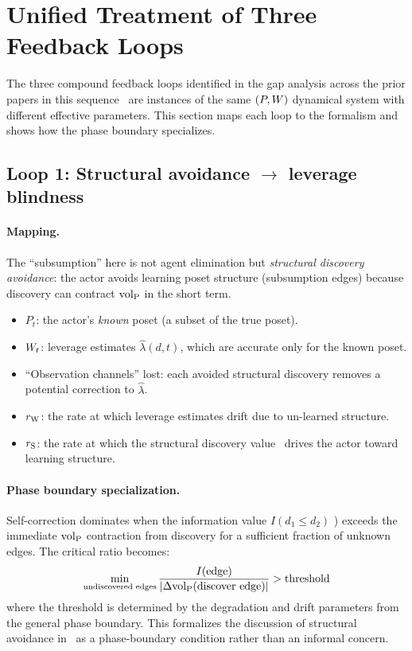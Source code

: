 \section{Unified Treatment of Three Feedback Loops}
\label{sec:unified_loops}

The three compound feedback loops identified in the gap analysis across
the prior papers in this sequence~\citep{lasser2026gfm,lasser2026poset,lasser2026horizon,lasser2026scm,lasser2026exo} are instances of the same $(P, W)$ dynamical system with
different effective parameters.  This section maps each loop to the
formalism and shows how the phase boundary specializes.

\subsection{Loop 1: Structural avoidance $\to$ leverage blindness}

\paragraph{Mapping.}
The ``subsumption'' here is not agent elimination but \emph{structural
discovery avoidance}: the actor avoids learning poset structure
(subsumption edges) because discovery can contract ${\operatorname{vol}_{\mathrm{P}}}$ in the short
term.

\begin{itemize}
\item $P_t$: the actor's \emph{known} poset (a subset of the true
  poset).
\item $W_t$: leverage estimates $\hat{\lambda}(d, t)$, which are
  accurate only for the known poset.
\item ``Observation channels'' lost: each avoided structural discovery
  removes a potential correction to $\hat{\lambda}$.
\item $r_{\mathrm{W}}$: the rate at which leverage estimates drift due to
  un-learned structure.
\item $r_{\mathrm{S}}$: the rate at which the structural discovery
  value~\citep[Proposition~2, Definition~5]{lasser2026horizon} drives the actor toward
  learning structure.
\end{itemize}

\paragraph{Phase boundary specialization.}
Self-correction dominates when the information value $I(d_1 \leq d_2)$
\citep[Definition~5]{lasser2026horizon}) exceeds the immediate ${\operatorname{vol}_{\mathrm{P}}}$ contraction from
discovery for a sufficient fraction of unknown edges.  The critical
ratio becomes:
\begin{equation}
\label{eq:loop1_boundary}
\min_{\text{undiscovered edges}}
  \frac{I(\text{edge})}{|\Delta{\operatorname{vol}_{\mathrm{P}}}(\text{discover edge})|}
  > \text{threshold}
\end{equation}
where the threshold is determined by the degradation and drift
parameters from the general phase boundary.  This formalizes the
discussion of structural avoidance in~\citet{lasser2026poset} as a phase-boundary condition
rather than an informal concern.

